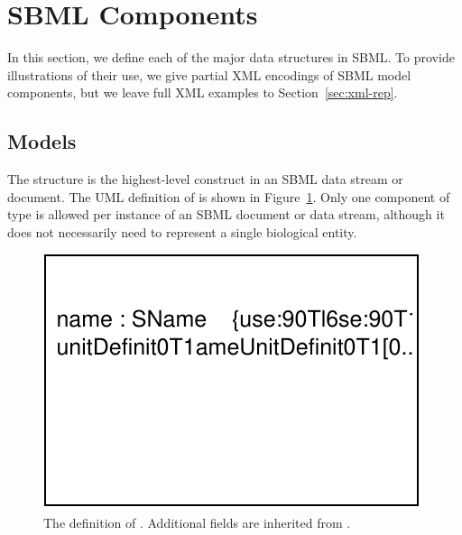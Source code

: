 \documentclass[10pt]{cekarticle}
\newcommand{\vref}[1]{\ref{#1}}
\begin{document}




\section{SBML Components}
\label{sec:elements}

In this section, we define each of the major data structures in SBML.  To
provide illustrations of their use, we give partial XML encodings of SBML
model components, but we leave full XML examples to
Section~\ref{sec:xml-rep}.


\subsection{Models}
\label{sec:model}

The  structure is the highest-level construct in an SBML data
stream or document.  The UML definition of  is shown in
Figure~\vref{fig:model}.  Only one component of type  is
allowed per instance of an SBML document or data stream, although it does
not necessarily need to represent a single biological entity.

\begin{figure}[htb]
  \centering
  \includegraphics[scale = 0.65]{model}
  \caption{The definition of .  Additional fields are
    inherited from .}
  \vspace*{-0.7ex}
  \label{fig:model}
\end{figure}
\end{document}
